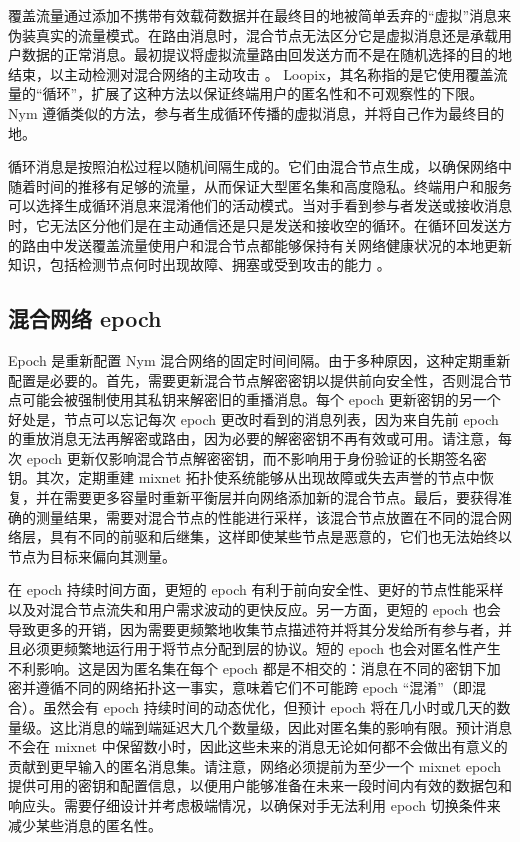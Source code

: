\documentclass{article}
\begin{document}
	覆盖流量通过添加不携带有效载荷数据并在最终目的地被简单丢弃的“虚拟”消息来伪装真实的流量模式。在路由消息时，混合节点无法区分它是虚拟消息还是承载用户数据的正常消息。最初提议将虚拟流量路由回发送方而不是在随机选择的目的地结束，以主动检测对混合网络的主动攻击 \cite{ref30}。 Loopix，其名称指的是它使用覆盖流量的“循环”，扩展了这种方法以保证终端用户的匿名性和不可观察性的下限\cite{ref89}。Nym 遵循类似的方法，参与者生成循环传播的虚拟消息，并将自己作为最终目的地。\newline

	循环消息是按照泊松过程以随机间隔生成的。它们由混合节点生成，以确保网络中随着时间的推移有足够的流量，从而保证大型匿名集和高度隐私。终端用户和服务可以选择生成循环消息来混淆他们的活动模式。当对手看到参与者发送或接收消息时，它无法区分他们是在主动通信还是只是发送和接收空的循环。在循环回发送方的路由中发送覆盖流量使用户和混合节点都能够保持有关网络健康状况的本地更新知识，包括检测节点何时出现故障、拥塞或受到攻击的能力 \cite{ref30}。\newline

	\subsection{混合网络 epoch}

	Epoch 是重新配置 Nym 混合网络的固定时间间隔。由于多种原因，这种定期重新配置是必要的。首先，需要更新混合节点解密密钥以提供前向安全性，否则混合节点可能会被强制使用其私钥来解密旧的重播消息。每个 epoch 更新密钥的另一个好处是，节点可以忘记每次 epoch 更改时看到的消息列表，因为来自先前 epoch 的重放消息无法再解密或路由，因为必要的解密密钥不再有效或可用。请注意，每次 epoch 更新仅影响混合节点解密密钥，而不影响用于身份验证的长期签名密钥。其次，定期重建 mixnet 拓扑使系统能够从出现故障或失去声誉的节点中恢复，并在需要更多容量时重新平衡层并向网络添加新的混合节点。最后，要获得准确的测量结果，需要对混合节点的性能进行采样，该混合节点放置在不同的混合网络层，具有不同的前驱和后继集，这样即使某些节点是恶意的，它们也无法始终以节点为目标来偏向其测量。\newline

	在 epoch 持续时间方面，更短的 epoch 有利于前向安全性、更好的节点性能采样以及对混合节点流失和用户需求波动的更快反应。另一方面，更短的 epoch 也会导致更多的开销，因为需要更频繁地收集节点描述符并将其分发给所有参与者，并且必须更频繁地运行用于将节点分配到层的协议。短的 epoch 也会对匿名性产生不利影响。这是因为匿名集在每个 epoch 都是不相交的：消息在不同的密钥下加密并遵循不同的网络拓扑这一事实，意味着它们不可能跨 epoch “混淆”（即混合）。虽然会有 epoch 持续时间的动态优化，但预计 epoch 将在几小时或几天的数量级。这比消息的端到端延迟大几个数量级，因此对匿名集的影响有限。预计消息不会在 mixnet 中保留数小时，因此这些未来的消息无论如何都不会做出有意义的贡献到更早输入的匿名消息集。请注意，网络必须提前为至少一个 mixnet epoch 提供可用的密钥和配置信息，以便用户能够准备在未来一段时间内有效的数据包和响应头。需要仔细设计并考虑极端情况，以确保对手无法利用 epoch 切换条件来减少某些消息的匿名性。\newline
\end{document}
